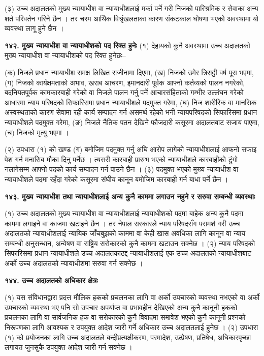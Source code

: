 (३) उच्च अदालतको मुख्य न्यायाधीश वा न्यायाधीशलाई मर्का पर्ने गरी निजको पारिश्रमिक र सेवाका अन्य शर्त परिवर्तन गरिने छैन ।
तर चरम आर्थिक विश्रृंखलताका कारण संकटकाल घोषणा भएको अवस्थामा यो व्यवस्था लागू हुने छैन ।

\textbf{१४२. मुख्य न्यायाधीश वा न्यायाधीशको पद रिक्त हुनेः} (१) देहायको कुनै अवस्थामा उच्च अदालतको मुख्य न्यायाधीश वा न्यायाधीशको पद रिक्त हुनेछः–

(क) निजले प्रधान न्यायाधीश समक्ष लिखित राजीनामा दिएमा,
(ख) निजको उमेर त्रिसठ्ठी वर्ष पूरा भएमा,
(ग) निजको कार्यक्षमताको अभाव, खराब आचरण, इमानदारी पूर्वक आफ्नो कर्तव्यको पालन नगरेको, बदनियतपूर्वक कामकारबाही गरेको वा निजले पालन गर्नु पर्ने आचारसंहिताको गम्भीर उल्लंघन गरेको आधारमा न्याय परिषदको सिफारिसमा प्रधान न्यायाधीशले पदमुक्त गरेमा,
(घ) निज शारीरिक वा मानसिक अस्वस्थताको कारण सेवामा रही कार्य सम्पादन गर्न असमर्थ रहेको भनी न्यायपरिषदको सिफारिसमा प्रधान न्यायाधीशले पदमुक्त गरेमा,
(ङ) निजले नैतिक पतन देखिने फौजदारी कसूरमा अदालतबाट सजाय पाएमा,
(च) निजको मृत्यु भएमा ।

(२) उपधारा (१) को खण्ड (ग) बमोजिम पदमुक्त गर्नु अघि आरोप लागेको न्यायाधीशलाई आफनो सफाइ पेश गर्न मनासिब मौका दिनु पर्नेछ । त्यसरी कारबाही प्रारम्भ भएको न्यायाधीशले कारबाहीको टुंगो नलागेसम्म आफ्नो पदको कार्य सम्पादन गर्न पाउने छैन । (३) पदमुक्त भएको मुख्य न्यायाधीश वा न्यायाधीशले पदमा रहँदा गरेको कसूरमा संघीय कानून बमोजिम कारबाही गर्न बाधा पर्ने छैन ।

\textbf{१४३. मुख्य न्यायाधीश तथा न्यायाधीशलाई अन्य कुनै काममा लगाउन नहुने र सरुवा सम्बन्धी व्यवस्थाः}

(१) उच्च अदालतको मुख्य न्यायाधीश वा न्यायाधीशलाई न्यायाधीशको पदमा बाहेक अन्य कुनै पदमा काममा लगाइने वा काजमा खटाइने छैन । तर नेपाल सरकारले न्याय परिषदसँग परामर्श गरी उच्च अदालतको न्यायाधीशलाई न्यायिक जाँचबुझको काममा वा केही खास अवधिका लागि कानून वा न्याय सम्बन्धी अनुसन्धान, अन्वेषण वा राष्ट्रिय सरोकारको कुनै काममा खटाउन सक्नेछ ।
(२) न्याय परिषदको सिफारिसमा प्रधान न्यायाधीशले उच्च अदालतकाठद्द न्यायाधीशलाई एक उच्च अदालतको न्यायाधीशबाट अर्को उच्च अदालतको न्यायाधीशमा सरुवा गर्न सक्नेछ ।

\textbf{१४४. उच्च अदालतको अधिकार क्षेत्रः}

(१) यस संविधानद्वारा प्रदत्त मौलिक हकको प्रचलनका लागि वा अर्को उपचारको व्यवस्था नभएको वा अर्को उपचारको व्यवस्था भए पनि सो उपचार अपर्याप्त वा प्रभावहीन देखिएको अन्य कुनै कानूनी हकको प्रचलनका लागि वा सार्वजनिक हक वा सरोकारको कुनै विवादमा समावेश भएको कुनै कानूनी प्रश्नको निरूपणका लागि आवश्यक र उपयुक्त आदेश जारी गर्ने अधिकार उच्च अदालतलाई हुनेछ ।
(२) उपधारा (१) को प्रयोजनका लागि उच्च अदालतले बन्दीप्रत्यक्षीकरण, परमादेश, उत्प्रेषण, प्रतिषेध, अधिकारपृच्छा लगायत जुनसुकै उपयुक्त आदेश जारी गर्न सक्नेछ ।

